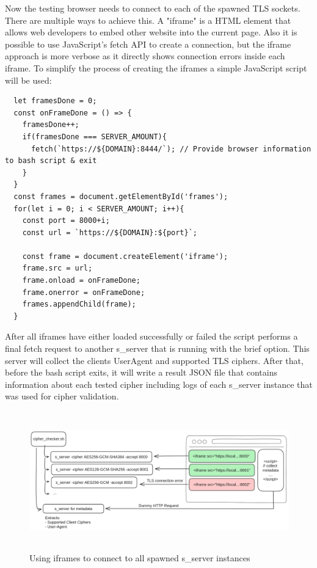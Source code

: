 \documentclass[12pt]{scrbook}
\begin{document}
\newpage

Now the testing browser needs to connect to each of the spawned TLS sockets. There are multiple ways to achieve this.
A "iframe" is a HTML element that allows web developers to embed other website into the current page. Also it is possible
to use JavaScript's fetch API to create a connection, but the iframe approach is more verbose as it directly shows
connection errors inside each iframe. To simplify the process of creating the iframes a simple JavaScript script will be used:

\begin{verbatim}
  let framesDone = 0;
  const onFrameDone = () => {
    framesDone++;
    if(framesDone === SERVER_AMOUNT){
      fetch(`https://${DOMAIN}:8444/`); // Provide browser information to bash script & exit
    }
  }
  const frames = document.getElementById('frames');
  for(let i = 0; i < SERVER_AMOUNT; i++){
    const port = 8000+i;
    const url = `https://${DOMAIN}:${port}`;

    const frame = document.createElement('iframe');
    frame.src = url;
    frame.onload = onFrameDone;
    frame.onerror = onFrameDone;
    frames.appendChild(frame);
  }
\end{verbatim}

After all iframes have either loaded successfully or failed the script performs a final fetch request to another
s\_server that is running with the \-brief option. This server will collect the clients User\-Agent and supported TLS ciphers.
After that, before the bash script exits, it will write a result JSON file that contains information about each tested cipher including logs
of each s\_server instance that was used for cipher validation.

\begin{figure}[!h]
  \centering
  \includegraphics[height=6cm]{./images/cipher_check_setup.png}
  \caption{Using iframes to connect to all spawned s\_server instances}
\end{figure}
\end{document}
